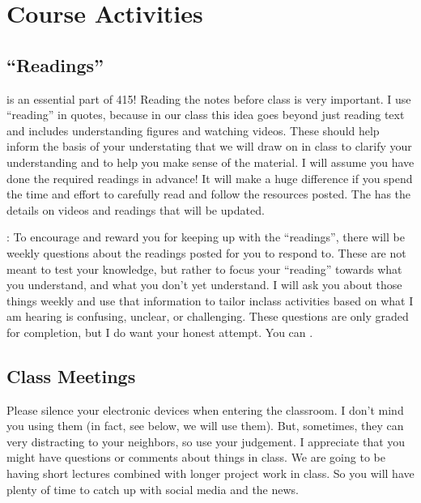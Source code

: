 \documentclass[letterpaper,10pt,english]{jupyterBook}
\begin{document}
\section{Course Activities}
\label{\detokenize{content/0_course/design:course-activities}}

\subsection{“Readings”}
\label{\detokenize{content/0_course/design:readings}}
\sphinxAtStartPar
{} is an essential part of 415! Reading the notes before class is very important. I use “reading” in quotes, because in our class this idea goes beyond just reading text and includes understanding figures and watching videos. These should help inform the basis of your understating that we will draw on in class to clarify your understanding and to help you make sense of the material. I will assume you have done the required readings in advance! It will make a huge difference if you spend the time and effort to carefully read and follow the resources posted. The {\hyperref[\detokenize{content/0_course/calendar::doc}]{}} has the details on videos and readings that will be updated.

\sphinxAtStartPar
{}: To encourage and reward you for keeping up with the “readings”, there will be weekly questions about the readings posted for you to respond to. These are not meant to test your knowledge, but rather to focus your “reading” towards what you understand, and what you don’t yet understand. I will ask you about those things weekly and use that information to tailor in\sphinxhyphen{}class activities based on what I am hearing is confusing, unclear, or challenging. These questions are only graded for completion, but I do want your honest attempt. You can {\hyperref[\detokenize{content/0_course/reading_questions::doc}]{}}.


\subsection{Class Meetings}
\label{\detokenize{content/0_course/design:class-meetings}}
\sphinxAtStartPar
{} Please silence your electronic devices when entering the classroom. I don’t mind you using them (in fact, see below, we will use them). But, sometimes, they can very distracting to your neighbors, so use your judgement. I appreciate that you might have questions or comments about things in class. We are going to be having short lectures combined with longer project work in class. So you will have plenty of time to catch up with social media and the news.
\end{document}
